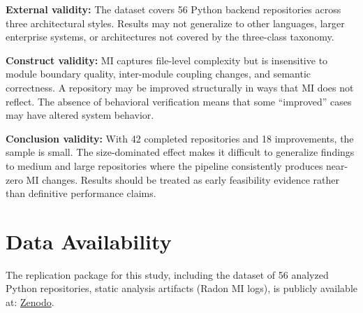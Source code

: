 \documentclass[sigconf,review,anonymous]{acmart}
\begin{document}
\textbf{External validity:} The dataset covers 56 Python backend repositories across three architectural styles. Results may not generalize to other languages, larger enterprise systems, or architectures not covered by the three-class taxonomy.

\textbf{Construct validity:} MI captures file-level complexity but is insensitive to module boundary quality, inter-module coupling changes, and semantic correctness. A repository may be improved structurally in ways that MI does not reflect. The absence of behavioral verification means that some ``improved'' cases may have altered system behavior.

\textbf{Conclusion validity:} With 42 completed repositories and 18 improvements, the sample is small. The size-dominated effect makes it difficult to generalize findings to medium and large repositories where the pipeline consistently produces near-zero MI changes. Results should be treated as early feasibility evidence rather than definitive performance claims.



\section*{Data Availability}

The replication package for this study, including the dataset of 56 analyzed Python repositories, static analysis artifacts (Radon MI logs), is publicly available at: \href{https://zenodo.org/records/20547119?token=eyJhbGciOiJIUzUxMiJ9.eyJpZCI6ImI0MmIzODE2LTMzMjgtNGRlYi1hNzA3LWVkMzlkMjhmZDg5NSIsImRhdGEiOnt9LCJyYW5kb20iOiI5NTIxZTg5YmIxZmM0ZGJmNGYwMzQzZDBkODk5NjY0OSJ9.P260LQG5q0QhuY-KJ7rkhC5Pq0Xpnu5ywdNOCWq2PuVqB0g3l0s8o3M6PhZJFBNEpGGjJRoAx4oZ351grRPyCw}{Zenodo}.

\end{document}
